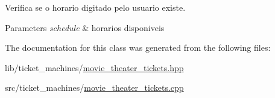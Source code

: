 Verifica se o horario digitado pelo usuario existe. 


\begin{DoxyParams}{Parameters}
{\em schedule} & horarios disponiveis \\
\hline
\end{DoxyParams}


The documentation for this class was generated from the following files\+:\begin{DoxyCompactItemize}
\item 
lib/ticket\+\_\+machines/\hyperlink{movie__theater__tickets_8hpp}{movie\+\_\+theater\+\_\+tickets.\+hpp}\item 
src/ticket\+\_\+machines/\hyperlink{movie__theater__tickets_8cpp}{movie\+\_\+theater\+\_\+tickets.\+cpp}\end{DoxyCompactItemize}
